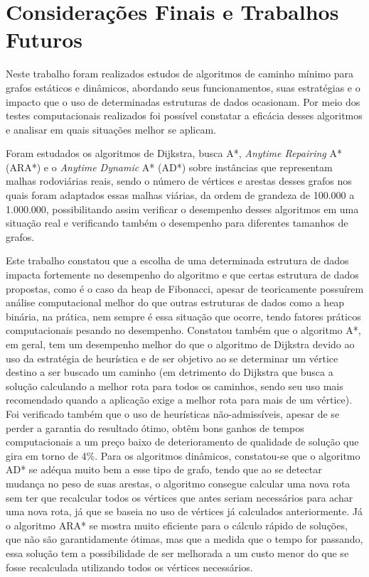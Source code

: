 \chapter{Considerações Finais e Trabalhos Futuros}
\label{sec-conclusao}

Neste trabalho foram realizados estudos de algoritmos de caminho mínimo para grafos estáticos e dinâmicos, abordando seus funcionamentos, suas estratégias e o impacto que o uso de determinadas estruturas de dados ocasionam. Por meio dos testes computacionais realizados foi possível constatar a eficácia desses algoritmos e analisar em quais situações melhor se aplicam.

Foram estudados os algoritmos de Dijkstra, busca A*, \textit{Anytime Repairing} A* (ARA*) e o \textit{Anytime Dynamic} A* (AD*) sobre instâncias que representam malhas rodoviárias reais, sendo o número de vértices e arestas desses grafos nos quais foram adaptados essas malhas viárias, da ordem de grandeza de 100.000 a 1.000.000, possibilitando assim verificar o desempenho desses algoritmos em uma situação real e verificando também o desempenho para diferentes tamanhos de grafos.

Este trabalho constatou que a escolha de uma determinada estrutura de dados impacta fortemente no desempenho do algoritmo e que certas estrutura de dados propostas, como é o caso da heap de Fibonacci, apesar de teoricamente possuírem análise computacional melhor do que outras estruturas de dados como a heap binária, na prática, nem sempre é essa situação que ocorre, tendo fatores práticos computacionais pesando no desempenho. Constatou também que o algoritmo A*, em geral, tem um desempenho melhor do que o algoritmo de Dijkstra devido ao uso da estratégia de heurística e de ser objetivo ao se determinar um vértice destino a ser buscado um caminho (em detrimento do Dijkstra que busca a solução calculando a melhor rota para todos os caminhos, sendo seu uso mais recomendado quando a aplicação exige a melhor rota para mais de um vértice). Foi verificado também que o uso de heurísticas não-admissíveis, apesar de se perder a garantia do resultado ótimo, obtêm bons ganhos de tempos computacionais a um preço baixo de deterioramento de qualidade de solução que gira em torno de 4\%. Para os algoritmos dinâmicos, constatou-se que o algoritmo AD* se adéqua muito bem a esse tipo de grafo, tendo que ao se detectar mudança no peso de suas arestas, o algoritmo consegue calcular uma nova rota sem ter que recalcular todos os vértices que antes seriam necessários para achar uma nova rota, já que se baseia no uso de vértices já calculados anteriormente. Já o algoritmo ARA* se mostra muito eficiente para o cálculo rápido de soluções, que não são garantidamente ótimas, mas que a medida que o tempo for passando, essa solução tem a possibilidade de ser melhorada a um custo menor do que se fosse recalculada utilizando todos os vértices necessários.

